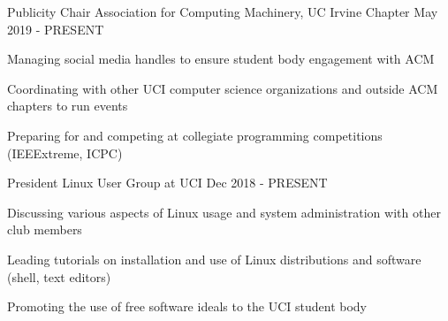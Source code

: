 
\begin{cventries}
	\cventry
	{Publicity Chair}
	{Association for Computing Machinery, UC Irvine Chapter}
	{}
	{May 2019 - PRESENT}
	{\begin{cvitems}
		\item{Managing social media handles to ensure student body engagement with ACM}
		\item{Coordinating with other UCI computer science organizations and outside ACM chapters to run events}
		\item{Preparing for and competing at collegiate programming competitions (IEEExtreme, ICPC)}
	 \end{cvitems}	
	}
	
	\cventry
	{President}
	{Linux User Group at UCI}
	{}
	{Dec 2018 - PRESENT}
	{\begin{cvitems}
		\item{Discussing various aspects of Linux usage and system administration with other club members}
		\item{Leading tutorials on installation and use of Linux distributions and software (shell, text editors)}
		\item{Promoting the use of free software ideals to the UCI student body}
	 \end{cvitems}
 	}
	
\end{cventries}
